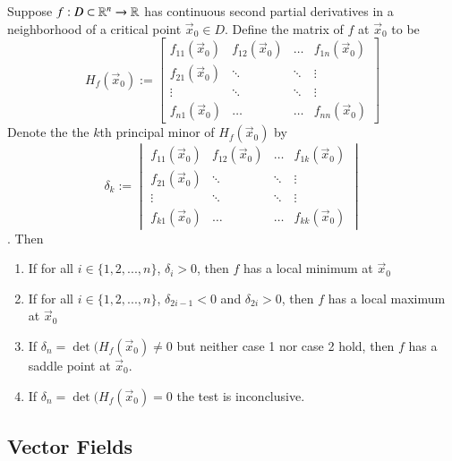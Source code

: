 \begin{appendices}
    \begin{namthm}
        Suppose $f:D \subset \mathbb R^n \rightarrow \mathbb R$ has continuous second partial derivatives in a neighborhood of a critical point $\vec{x}_0 \in D$. Define the  matrix of $f$ at $\vec{x}_0$ to be \begin{equation}
            H_f(\vec{x}_0) := \begin{bmatrix} f_{11}(\vec{x}_0) & f_{12}(\vec{x}_0) & \hdots & f_{1n}(\vec{x}_0) \\ f_{21}(\vec{x}_0) & \ddots & \ddots & \vdots \\ \vdots & \ddots & \ddots & \vdots \\ f_{n1}(\vec{x}_0) & \hdots & \hdots & f_{nn}(\vec{x}_0) \end{bmatrix}
        \end{equation}
        Denote the the $k$th principal minor of $H_f(\vec{x}_0)$ by \begin{equation}
            \delta_k := \begin{vmatrix} f_{11}(\vec{x}_0) & f_{12}(\vec{x}_0) & \hdots & f_{1k}(\vec{x}_0) \\ f_{21}(\vec{x}_0) & \ddots & \ddots & \vdots \\ \vdots & \ddots & \ddots & \vdots \\ f_{k1}(\vec{x}_0) & \hdots & \hdots & f_{kk}(\vec{x}_0) \end{vmatrix}
        \end{equation}. Then \begin{enumerate}
            \item If for all $i \in \{1,2,...,n\}$, $\delta_i > 0$, then $f$ has a local minimum at $\vec{x}_0$
            \item If for all $i \in \{1,2,...,n\}$, $\delta_{2i-1} <  0$ and $\delta_{2i} > 0$, then $f$ has a local maximum at $\vec{x}_0$
            \item If $\delta_n = \det(H_f(\vec{x}_0) \neq 0$ but neither case 1 nor case 2 hold, then $f$ has a saddle point at $\vec{x}_0$.
            \item If $\delta_n = \det(H_f(\vec{x}_0) = 0$ the test is inconclusive.
        \end{enumerate}
    \end{namthm}
    
    \subsection{Vector Fields}
    

\end{appendices}

